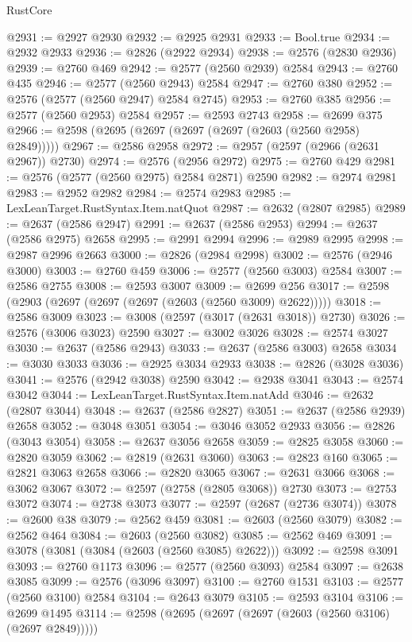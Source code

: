 \begin{lexlean}{RustCore}
\begin{coremodule}
@2931 := @2927 @2930
@2932 := @2925 @2931
@2933 := Bool.true
@2934 := @2932 @2933
@2936 := @2826 (@2922 @2934)
@2938 := @2576 (@2830 @2936)
@2939 := @2760 @469
@2942 := @2577 (@2560 @2939) @2584
@2943 := @2760 @435
@2946 := @2577 (@2560 @2943) @2584
@2947 := @2760 @380
@2952 := @2576 (@2577 (@2560 @2947) @2584 @2745)
@2953 := @2760 @385
@2956 := @2577 (@2560 @2953) @2584
@2957 := @2593 @2743
@2958 := @2699 @375
@2966 := @2598 (@2695 (@2697 (@2697 (@2697 (@2603 (@2560 @2958) @2849)))))
@2967 := @2586 @2958
@2972 := @2957 (@2597 (@2966 (@2631 @2967)) @2730)
@2974 := @2576 (@2956 @2972)
@2975 := @2760 @429
@2981 := @2576 (@2577 (@2560 @2975) @2584 @2871) @2590
@2982 := @2974 @2981
@2983 := @2952 @2982
@2984 := @2574 @2983
@2985 := LexLeanTarget.RustSyntax.Item.natQuot
@2987 := @2632 (@2807 @2985)
@2989 := @2637 (@2586 @2947)
@2991 := @2637 (@2586 @2953)
@2994 := @2637 (@2586 @2975) @2658
@2995 := @2991 @2994
@2996 := @2989 @2995
@2998 := @2987 @2996 @2663
@3000 := @2826 (@2984 @2998)
@3002 := @2576 (@2946 @3000)
@3003 := @2760 @459
@3006 := @2577 (@2560 @3003) @2584
@3007 := @2586 @2755
@3008 := @2593 @3007
@3009 := @2699 @256
@3017 := @2598 (@2903 (@2697 (@2697 (@2697 (@2603 (@2560 @3009) @2622)))))
@3018 := @2586 @3009
@3023 := @3008 (@2597 (@3017 (@2631 @3018)) @2730)
@3026 := @2576 (@3006 @3023) @2590
@3027 := @3002 @3026
@3028 := @2574 @3027
@3030 := @2637 (@2586 @2943)
@3033 := @2637 (@2586 @3003) @2658
@3034 := @3030 @3033
@3036 := @2925 @3034 @2933
@3038 := @2826 (@3028 @3036)
@3041 := @2576 (@2942 @3038) @2590
@3042 := @2938 @3041
@3043 := @2574 @3042
@3044 := LexLeanTarget.RustSyntax.Item.natAdd
@3046 := @2632 (@2807 @3044)
@3048 := @2637 (@2586 @2827)
@3051 := @2637 (@2586 @2939) @2658
@3052 := @3048 @3051
@3054 := @3046 @3052 @2933
@3056 := @2826 (@3043 @3054)
@3058 := @2637 @3056 @2658
@3059 := @2825 @3058
@3060 := @2820 @3059
@3062 := @2819 (@2631 @3060)
@3063 := @2823 @160
@3065 := @2821 @3063 @2658
@3066 := @2820 @3065
@3067 := @2631 @3066
@3068 := @3062 @3067
@3072 := @2597 (@2758 (@2805 @3068)) @2730
@3073 := @2753 @3072
@3074 := @2738 @3073
@3077 := @2597 (@2687 (@2736 @3074))
@3078 := @2600 @38
@3079 := @2562 @459
@3081 := @2603 (@2560 @3079)
@3082 := @2562 @464
@3084 := @2603 (@2560 @3082)
@3085 := @2562 @469
@3091 := @3078 (@3081 (@3084 (@2603 (@2560 @3085) @2622)))
@3092 := @2598 @3091
@3093 := @2760 @1173
@3096 := @2577 (@2560 @3093) @2584
@3097 := @2638 @3085
@3099 := @2576 (@3096 @3097)
@3100 := @2760 @1531
@3103 := @2577 (@2560 @3100) @2584
@3104 := @2643 @3079
@3105 := @2593 @3104
@3106 := @2699 @1495
@3114 := @2598 (@2695 (@2697 (@2697 (@2603 (@2560 @3106) (@2697 @2849)))))

\end{coremodule}
\end{lexlean}
